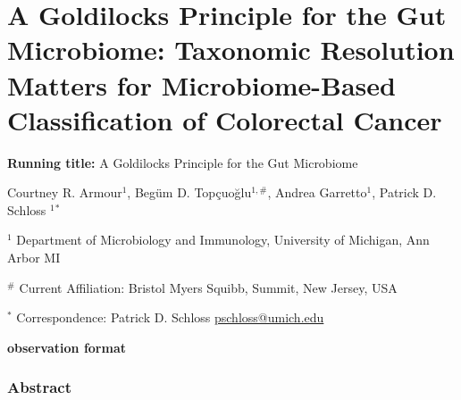 \documentclass[
]{article}
\author{}
\date{\vspace{-2.5em}}
\begin{document}
\hypertarget{a-goldilocks-principle-for-the-gut-microbiome-taxonomic-resolution-matters-for-microbiome-based-classification-of-colorectal-cancer}{%
\section{A Goldilocks Principle for the Gut Microbiome: Taxonomic
Resolution Matters for Microbiome-Based Classification of Colorectal
Cancer}\label{a-goldilocks-principle-for-the-gut-microbiome-taxonomic-resolution-matters-for-microbiome-based-classification-of-colorectal-cancer}}

\vspace{10mm}

\textbf{Running title:} A Goldilocks Principle for the Gut Microbiome

\vspace{10mm}

Courtney R. Armour\({^1}\), Begüm D. Topçuoğlu\(^{1,\#}\), Andrea
Garretto\({^1}\), Patrick D. Schloss \({^1}\)\({^*}\)

\vspace{5mm}

\({^1}\) Department of Microbiology and Immunology, University of
Michigan, Ann Arbor MI

\({^\#}\) Current Affiliation: Bristol Myers Squibb, Summit, New Jersey,
USA~

\vspace{5mm}

\({^*}\) Correspondence: Patrick D. Schloss
\href{mailto:pschloss@umich.edu}{pschloss@umich.edu}

\vspace{20mm}

\textbf{observation format}

\newpage

\hypertarget{abstract}{%
\subsubsection{Abstract}\label{abstract}}
\end{document}
